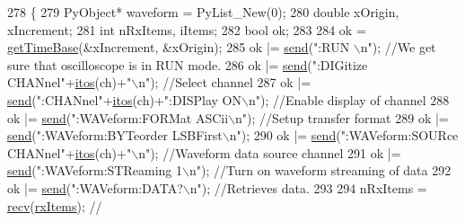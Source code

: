 \begin{DoxyCode}
278 \{
279     PyObject* waveform = PyList\_New(0);
280     \textcolor{keywordtype}{double} xOrigin, xIncrement;
281     \textcolor{keywordtype}{int} nRxItems, iItems;
282     \textcolor{keywordtype}{bool} ok;
283 
284     ok  = \hyperlink{classMSOxxxx_a9723e9234403d5eb74bde628fd78d56c}{getTimeBase}(&xIncrement, &xOrigin);
285     ok |= \hyperlink{classMSOxxxx_ae77668a1ae4ccb74e0ed5f2485dfdebf}{send}(\textcolor{stringliteral}{":RUN \(\backslash\)n"});                                                                  \textcolor{comment}{//We get
       sure that oscilloscope is in RUN mode.}
286     ok |= \hyperlink{classMSOxxxx_ae77668a1ae4ccb74e0ed5f2485dfdebf}{send}(\textcolor{stringliteral}{":DIGitize CHANnel"}+\hyperlink{Tools_8h_af330027dbdafb9a30768b3613c553e60}{itos}(ch)+\textcolor{stringliteral}{"\(\backslash\)n"});                  \textcolor{comment}{//Select channel}
287     ok |= \hyperlink{classMSOxxxx_ae77668a1ae4ccb74e0ed5f2485dfdebf}{send}(\textcolor{stringliteral}{":CHANnel"}+\hyperlink{Tools_8h_af330027dbdafb9a30768b3613c553e60}{itos}(ch)+\textcolor{stringliteral}{":DISPlay ON\(\backslash\)n"});                \textcolor{comment}{//Enable display of channel}
288     ok |= \hyperlink{classMSOxxxx_ae77668a1ae4ccb74e0ed5f2485dfdebf}{send}(\textcolor{stringliteral}{":WAVeform:FORMat ASCii\(\backslash\)n"});                                 \textcolor{comment}{//Setup transfer format}
289     ok |= \hyperlink{classMSOxxxx_ae77668a1ae4ccb74e0ed5f2485dfdebf}{send}(\textcolor{stringliteral}{":WAVeform:BYTeorder LSBFirst\(\backslash\)n"});
290     ok |= \hyperlink{classMSOxxxx_ae77668a1ae4ccb74e0ed5f2485dfdebf}{send}(\textcolor{stringliteral}{":WAVeform:SOURce CHANnel"}+\hyperlink{Tools_8h_af330027dbdafb9a30768b3613c553e60}{itos}(ch)+\textcolor{stringliteral}{"\(\backslash\)n"});   \textcolor{comment}{//Waveform data source channel}
291     ok |= \hyperlink{classMSOxxxx_ae77668a1ae4ccb74e0ed5f2485dfdebf}{send}(\textcolor{stringliteral}{":WAVeform:STReaming 1\(\backslash\)n"});                                  \textcolor{comment}{//Turn on waveform
       streaming of data}
292     ok |= \hyperlink{classMSOxxxx_ae77668a1ae4ccb74e0ed5f2485dfdebf}{send}(\textcolor{stringliteral}{":WAVeform:DATA?\(\backslash\)n"});                                                \textcolor{comment}{//Retrieves data.}
293 
294     nRxItems = \hyperlink{classMSOxxxx_aa02e46a61e287ef1f5377e9e42399faf}{recv}(\hyperlink{classMSOxxxx_a847cae37181e9ec5f481edcc3fb19b1a}{rxItems});                                                                \textcolor{comment}{//
}
\end{DoxyCode}
